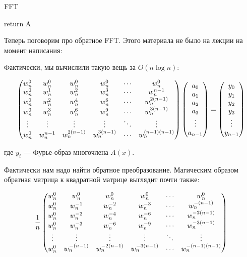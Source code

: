 \documentclass[a4paper, 12pt]{article}
\begin{document}
\begin{algorithm}
  \caption{FFT}
  \begin{algorithmic}[1]
     
    \EndIf
       
    \EndFor
    \State return A
    \EndFunction
  \end{algorithmic}
\end{algorithm}

Теперь поговорим про обратное FFT. Этого материала не было на лекции на момент
написания:

Фактически, мы вычислили такую вещь за $O(n\log n)$:


\[
  \begin{pmatrix}
    w_n^0 & w_n^0 & w_n^0 & w_n^0 & \cdots & w_n^0 \cr 
    w_n^0 & w_n^1 & w_n^2 & w_n^3 & \cdots & w_n^{n-1} \cr 
    w_n^0 & w_n^2 & w_n^4 & w_n^6 & \cdots & w_n^{2(n-1)} \cr 
    w_n^0 & w_n^3 & w_n^6 & w_n^9 & \cdots & w_n^{3(n-1)} \cr 
    \vdots & \vdots & \vdots & \vdots & \ddots & \vdots \cr 
    w_n^0 & w_n^{n-1} & w_n^{2(n-1)} & w_n^{3(n-1)} & \cdots & w_n^{(n-1)(n-1)}
  \end{pmatrix}
  \begin{pmatrix}
     a_0 \cr 
     a_1 \cr 
     a_2 \cr 
     a_3 \cr 
     \vdots \cr 
     a_{n-1}
  \end{pmatrix}
   =
  \begin{pmatrix}
     y_0 \cr 
     y_1 \cr 
     y_2 \cr 
     y_3 \cr 
     \vdots \cr 
     y_{n-1}
  \end{pmatrix}
\]

где $y_i$ --- Фурье-образ многочлена $A(x)$.

Фактически нам надо найти обратное преобразование. Магическим образом обратная
матрица к квадратной матрице выглядит почти также:

\[
  \frac{1}{n}
  \begin{pmatrix}
    w_n^0 & w_n^0 & w_n^0 & w_n^0 & \cdots & w_n^0 \cr 
    w_n^0 & w_n^{-1} & w_n^{-2} & w_n^{-3} & \cdots & w_n^{-(n-1)} \cr 
    w_n^0 & w_n^{-2} & w_n^{-4} & w_n^{-6} & \cdots & w_n^{-2(n-1)} \cr 
    w_n^0 & w_n^{-3} & w_n^{-6} & w_n^{-9} & \cdots & w_n^{-3(n-1)} \cr 
    \vdots & \vdots & \vdots & \vdots & \ddots & \vdots \cr 
    w_n^0 & w_n^{-(n-1)} & w_n^{-2(n-1)} & w_n^{-3(n-1)} & \cdots & w_n^{-(n-1)(n-1)}
  \end{pmatrix}
\]
\end{document}
